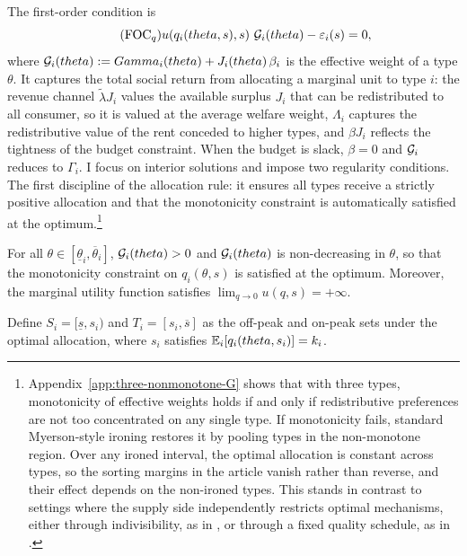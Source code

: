 \documentclass{class}
\begin{document}
The first-order condition is
\[
\label{KKT-qMD}\tag{FOC$_q$}
u\!\left(q_i(theta,s),s\right)\,\mathcal{G}_i(theta)-\varepsilon_i(s)=0,
\]
where $\mathcal{G}_i(theta) := Gamma_i(theta) + J_i(theta)\,\beta_i$ is the effective weight of a type $\theta$. It captures the total social return from allocating a marginal unit to type $i$: the revenue channel $\tilde\lambda J_i$ values the available surplus $J_i$ that can be redistributed to all consumer, so it is valued at the average welfare weight, $\Lambda_i$ captures the redistributive value of the rent conceded to higher types, and $\beta J_i$ reflects the tightness of the budget constraint. When the budget is slack, $\beta = 0$ and $\mathcal{G}_i$ reduces to $\Gamma_i$. I focus on interior solutions and impose two regularity conditions. The first discipline of the allocation rule: it ensures all types receive a strictly positive allocation and that the monotonicity constraint is automatically satisfied at the optimum.\footnote{Appendix~\ref{app:three-nonmonotone-G} shows that with three types, monotonicity of effective weights holds if and only if redistributive preferences are not too concentrated on any single type. If monotonicity fails, standard Myerson-style ironing restores it by pooling types in the non-monotone region. Over any ironed interval, the optimal allocation is constant across types, so the sorting margins in the article vanish rather than reverse, and their effect depends on the non-ironed types. This stands in contrast to settings where the supply side independently restricts optimal mechanisms, either through indivisibility, as in \cite{CONDORELLI2013582}, or through a fixed quality schedule, as in \cite{akbarpour2023redistributive}.}

\renewcommand{\theassumption}{Int}
\begin{assumption}\label{ass:interior}
For all $\theta\in\left[\underline{\theta}_i,\overline{\theta}_i\right]$, $\mathcal{G}_i(theta)>0$ and $\mathcal{G}_i(theta)$ is non-decreasing in $\theta$, so that the monotonicity constraint on $q_i(\theta,s)$ is satisfied at the optimum. Moreover, the marginal utility function satisfies $\lim_{q\rightarrow 0}u(q,s) = +\infty$.
\end{assumption}
\renewcommand{\theassumption}{\arabic{assumption}}

Define $S_i=[\underline s,s_i)$ and $T_i=[s_i,\overline s]$ as the off-peak and on-peak sets under the optimal allocation, where $s_i$ satisfies $\mathbb{E}_{i}\!\left[q_i(theta,s_i)\right]=k_i$.
\end{document}
